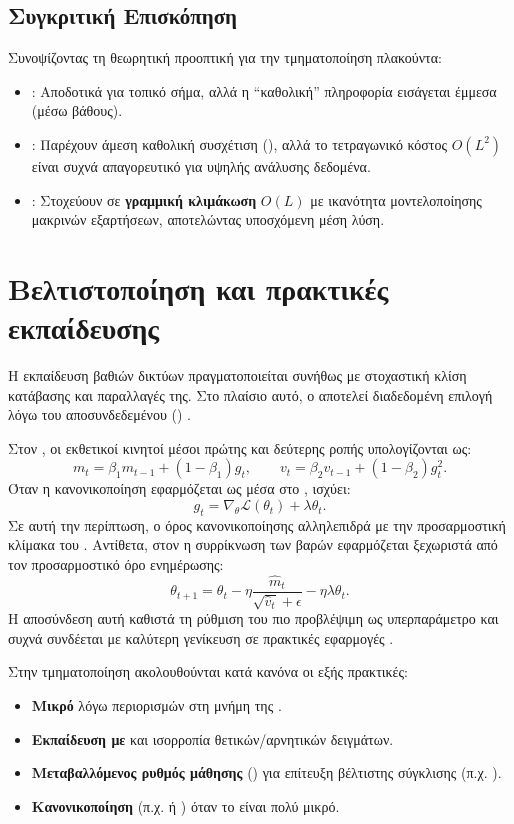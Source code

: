 \subsection{Συγκριτική Επισκόπηση}
Συνοψίζοντας τη θεωρητική προοπτική για την τμηματοποίηση πλακούντα:
\begin{itemize}
  \item \textbf{}: Αποδοτικά για τοπικό σήμα, αλλά η ``καθολική'' πληροφορία εισάγεται έμμεσα (μέσω βάθους).
  \item \textbf{}: Παρέχουν άμεση καθολική συσχέτιση 
  (), αλλά το τετρα\-γωνικό κόστος $O(L^2)$ είναι συχνά 
  απαγορευτικό για υψηλής ανάλυσης  δεδομένα.
  \item \textbf{}: Στοχεύουν σε \textbf{γραμμική κλιμάκωση} $O(L)$ 
  με ικανότητα μοντελοποί\-ησης μακρινών εξαρτήσεων, αποτελώντας υποσχόμενη μέση λύση.
\end{itemize}


\section{Βελτιστοποίηση και πρακτικές εκπαίδευσης}
\label{sec:training_practices}

Η εκπαίδευση βαθιών δικτύων πραγματοποιείται συνήθως με στοχαστική κλίση
κατά\-βασης και παραλλαγές της. Στο πλαίσιο αυτό, ο  αποτελεί
διαδεδομένη επιλογή λόγω του αποσυνδεδεμένου ()
 \cite{loshchilov2019adamw}.

Στον , οι εκθετικοί κινητοί μέσοι πρώτης και δεύτερης ροπής
υπολογίζονται ως:
\[
m_t = \beta_1 m_{t-1} + (1-\beta_1) g_t, \qquad
v_t = \beta_2 v_{t-1} + (1-\beta_2) g_t^2.
\]
Όταν η κανονικοποίηση εφαρμόζεται ως  μέσα στο , ισχύει:
\[
g_t = \nabla_{\theta}\mathcal{L}(\theta_t) + \lambda \theta_t.
\]
Σε αυτή την περίπτωση, ο όρος κανονικοποίησης αλληλεπιδρά με την
προσαρμοστική κλίμακα του . Αντίθετα, στον  η συρρίκνωση
των βαρών εφαρμόζεται ξεχωριστά από τον προσαρμοστικό όρο ενημέρωσης:
\[
\theta_{t+1} = \theta_t - \eta \frac{\hat m_t}{\sqrt{\hat v_t} + \epsilon}
- \eta \lambda \theta_t.
\]
Η αποσύνδεση αυτή καθιστά τη ρύθμιση του  πιο προβλέψιμη ως
υπερπαράμετρο και συχνά συνδέεται με καλύτερη γενίκευση σε πρακτικές εφαρμογές
\cite{loshchilov2019adamw}.

Στην  τμηματοποίηση ακολουθούνται κατά κανόνα οι εξής πρακτικές:
\begin{itemize}
  \item \textbf{Μικρό } λόγω περιορισμών στη μνήμη της .
  \item \textbf{Εκπαίδευση με } και ισορροπία θετικών/αρνητικών δειγμάτων.
  \item \textbf{Μεταβαλλόμενος ρυθμός μάθησης} () για επίτευξη βέλτιστης σύγκλισης (π.χ.  \cite{lr_schedulers}).
  \item \textbf{Κανονικοποίηση} (π.χ.  ή ) όταν το  είναι πολύ μικρό.
\end{itemize}

